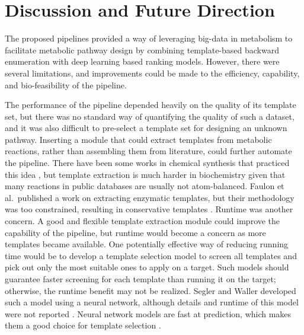 \documentclass{article}
\begin{document}
%
\section{Discussion and Future Direction} \label{sec:discussion}

The proposed pipelines provided a way of leveraging big-data in metabolism to facilitate metabolic pathway design by combining template-based backward enumeration with deep learning based ranking models.
However, there were several limitations, and improvements could be made to the efficiency, capability, and bio-feasibility of the pipeline.

The performance of the pipeline depended heavily on the quality of its template set, but there was no standard way of quantifying the quality of such a dataset, and it was also difficult to pre-select a template set for designing an unknown pathway.
Inserting a module that could extract templates from metabolic reactions, rather than assembling them from literature, could further automate the pipeline.
There have been some works in chemical synthesis that practiced this idea \citep{coley2017prediction, coley2017computer, segler2018planning}, but template extraction is much harder in biochemistry given that many reactions in public databases are usually not atom-balanced.
Faulon et al.\ published a work on extracting enzymatic templates, but their methodology was too constrained, resulting in conservative templates \citep{duigou2019retrorules}.
Runtime was another concern.
A good and flexible template extraction module could improve the capability of the pipeline, but runtime would become a concern as more templates became available.
One potentially effective way of reducing running time would be to develop a template selection model to screen all templates and pick out only the most suitable ones to apply on a target.
Such models should guarantee faster screening for each template than running it on the target; otherwise, the runtime benefit may not be realized.
Segler and Waller developed such a model using a neural network, although details and runtime of this model were not reported \citep{segler2018planning}.
Neural network models are fast at prediction, which makes them a good choice for template selection \citep{goodfellow2016deep}.
\end{document}
